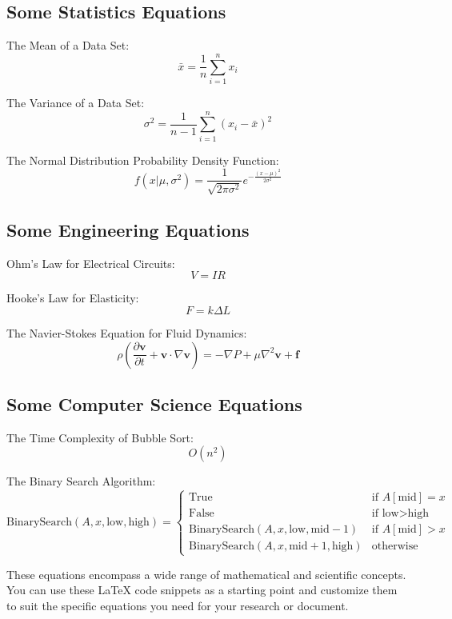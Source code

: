 \subsection{Some Statistics Equations}

The Mean of a Data Set:
\begin{equation}
\bar{x} = \frac{1}{n} \sum_{i=1}^{n} x_i
\end{equation}

The Variance of a Data Set:
\begin{equation}
\sigma^2 = \frac{1}{n-1} \sum_{i=1}^{n} (x_i - \bar{x})^2
\end{equation}

The Normal Distribution Probability Density Function:
\begin{equation}
f(x | \mu, \sigma^2) = \frac{1}{\sqrt{2\pi\sigma^2}} e^{-\frac{(x-\mu)^2}{2\sigma^2}}
\end{equation}

\subsection{Some Engineering Equations}

Ohm's Law for Electrical Circuits:
\begin{equation}
V = IR
\end{equation}

Hooke's Law for Elasticity:
\begin{equation}
F = k\Delta L
\end{equation}

The Navier-Stokes Equation for Fluid Dynamics:
\begin{equation}
\rho \left( \frac{\partial \mathbf{v}}{\partial t} + \mathbf{v} \cdot \nabla \mathbf{v} \right) = -\nabla P + \mu \nabla^2 \mathbf{v} + \mathbf{f}
\end{equation}

\subsection{Some Computer Science Equations}

The Time Complexity of Bubble Sort:
\begin{equation}
O(n^2)
\end{equation}

The Binary Search Algorithm:
\begin{equation}
\text{BinarySearch}(A, x, \text{low}, \text{high}) = 
\begin{cases}
\text{True} & \text{if } A[\text{mid}] = x \\
\text{False} & \text{if } \text{low} > \text{high} \\
\text{BinarySearch}(A, x, \text{low}, \text{mid} - 1) & \text{if } A[\text{mid}] > x \\
\text{BinarySearch}(A, x, \text{mid} + 1, \text{high}) & \text{otherwise}
\end{cases}
\end{equation}

These equations encompass a wide range of mathematical and scientific concepts. You can use these LaTeX code snippets as a starting point and customize them to suit the specific equations you need for your research or document.